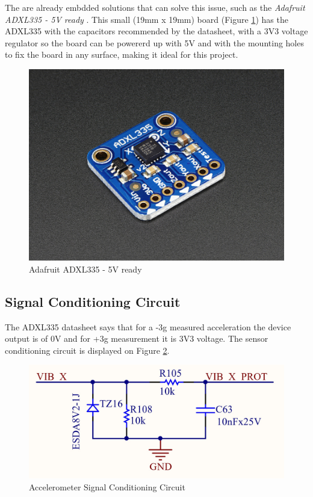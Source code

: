 	The are already embdded solutions that can solve this issue, such as the \textit{Adafruit ADXL335 - 5V ready} \cite{adafruit-5v-ready}. This small (19mm x 19mm) board (Figure \ref{fig:adafruit-adxl335}) has the ADXL335 with the capacitors recommended by the datasheet, with a 3V3 voltage regulator so the board can be powererd up with 5V and with the mounting holes to fix the board in any surface, making it ideal for this project.

	\begin{figure}[htbp]
		\centering
			\includegraphics[scale=0.2]{figuras/fig-adafruit-adxl335.jpg}
		\caption{Adafruit ADXL335 - 5V ready \cite{adafruit-adxl335}}
		\label{fig:adafruit-adxl335}
	\end{figure}


\subsection{Signal Conditioning Circuit}\label{ssec:accelerometer-signal-conditioning-circuit}

	The ADXL335 datasheet \cite{devices2010adxl335} says that for a -3g measured acceleration the device output is of 0V and for +3g measurement it is 3V3 voltage. The sensor conditioning circuit is displayed on Figure \ref{fig:accelerometer-signal-conditioning-circuit}.

	\begin{figure}[htbp]
		\centering
			\includegraphics[scale=0.5]{figuras/fig-accelerometer-signal-conditioning-circuit}
		\caption{Accelerometer Signal Conditioning Circuit}
		\label{fig:accelerometer-signal-conditioning-circuit}
	\end{figure}



